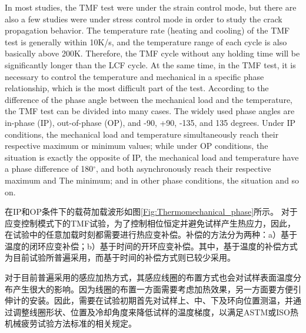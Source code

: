 In most studies, the TMF test were under the strain control mode, but there are also a few studies were under stress control mode in order to study the crack propagation behavior.
The temperature rate (heating and cooling) of the TMF test is generally within 10K/s, and the temperature range of each cycle is also basically above 200K. Therefore, the TMF cycle without any holding time will be significantly longer than the LCF cycle. At the same time, in the TMF test, it is necessary to control the temperature and mechanical in a specific phase relationship, which is the most difficult part of the test. According to the difference of the phase angle between the mechanical load and the temperature, the TMF test can be divided into many cases. The widely used phase angles are in-phase (IP), out-of-phase (OP), and -90, +90, -135, and 135 degrees. Under IP conditions, the mechanical load and temperature simultaneously reach their respective maximum or minimum values; while under OP conditions, the situation is exactly the opposite of IP, the mechanical load and temperature have a phase difference of 180$^\circ$, and both asynchronously reach their respective maximum and The minimum; and in other phase conditions, the situation and so on.

在IP和OP条件下的载荷加载波形如图\ref{Fig:Thermomechanical_phase}所示。
对于应变控制模式下的TMF试验，为了控制相位恒定并避免试样产生热应力，因此，在试验中的任意加载时刻都需要进行热应变补偿。补偿的方法分为两种：a）基于温度的闭环应变补偿；b）基于时间的开环应变补偿。其中，基于温度的补偿方式为目前试验所普遍采用，而基于时间的补偿方式则已较少采用。

对于目前普遍采用的感应加热方式，其感应线圈的布置方式也会对试样表面温度分布产生很大的影响。因为线圈的布置一方面需要考虑加热效果，另一方面要方便引伸计的安装\cite{Hahner2006}。因此，需要在试验初期首先对试样上、中、下及环向位置测温，并通过调整线圈形状、位置及冷却角度来降低试样的温度梯度，以满足ASTM或ISO热机械疲劳试验方法标准的相关规定。

